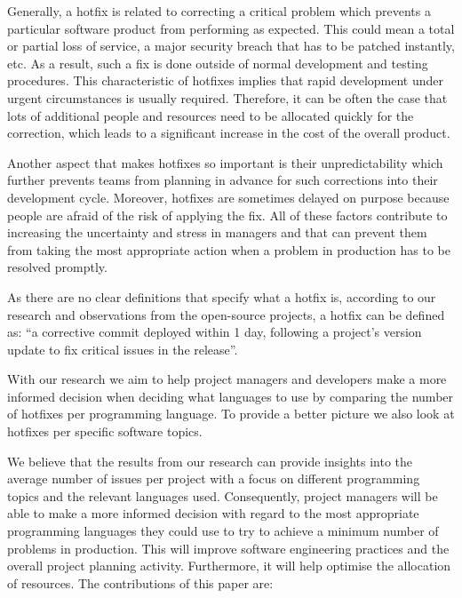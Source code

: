 Generally, a hotfix is related to correcting a critical problem which prevents a particular software product from performing as expected. This could mean a total or partial loss of service, a major security breach that has to be patched instantly, etc. As a result, such a fix is done outside of normal development and testing procedures. This characteristic of hotfixes implies that rapid development under urgent circumstances is usually required. Therefore, it can be often the case that lots of additional people and resources need to be allocated quickly for the correction, which leads to a significant increase in the cost of the overall product.

Another aspect that makes hotfixes so important is their unpredictability which further prevents teams from planning in advance for such corrections into their development cycle. Moreover, hotfixes are sometimes delayed on purpose because people are afraid of the risk of applying the fix. All of these factors contribute to increasing the uncertainty and stress in managers and that can prevent them from taking the most appropriate action when a problem in production has to be resolved promptly.

As there are no clear definitions that specify what a hotfix is, according to our research and observations from the open-source projects, a hotfix can be defined as: ``a corrective commit deployed within 1 day, following a project's version update to fix critical issues in the release''.\par

With our research we aim to help project managers and developers make a more informed decision when deciding what languages to use by comparing the number of hotfixes per programming language. To provide a better picture we also look at hotfixes per specific software topics. 

We believe that the results from our research can provide insights into the average number of issues per project with a focus on different programming topics and the relevant languages used. Consequently, project managers will be able to make a more informed decision with regard to the most appropriate programming languages they could use to try to achieve a minimum number of problems in production. This will improve software engineering practices and the overall project planning activity. Furthermore, it will help optimise the allocation of resources.
The contributions of this paper are:


